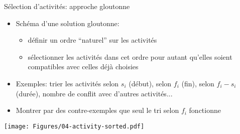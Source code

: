 \begin{frame}{Sélection d'activités: approche gloutonne}


\begin{itemize}
\item Schéma d'une solution gloutonne:
\begin{itemize}
\item définir un ordre ``naturel'' sur les activités
\item sélectionner les activités dans cet ordre pour autant qu'elles soient compatibles avec celles déjà choisies
\end{itemize}
\item Exemples: trier les activités selon $s_i$ (début), selon $f_i$ (fin), selon $f_i-s_i$ (durée), nombre de conflit avec d'autres activités...
\item Montrer par des contre-exemples que seul le tri selon $f_i$ fonctionne
\end{itemize}

\centerline{\texttt{[image: Figures/04-activity-sorted.pdf]}}


\end{frame}

